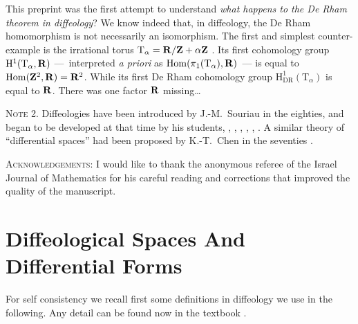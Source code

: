 \documentclass[12pt,reqno]{amsart}
\theoremstyle{article}
\def \D{\mathrm D}
\def \H{\mathrm H}
\def \R{\mathrm R}
\def \T{\mathrm T}
\newcommand{\RR}{{\bf R}}
\newcommand{\ZZ}{{\bf Z}}
\DeclareMathOperator{\Hom}{Hom}
\def \H{\mathrm H}
\begin{document}
  This preprint was the first attempt to understand \emph{what happens to the De Rham theorem in diffeology}?
  We know indeed that,
  in diffeology,
  the De Rham homomorphism is not necessarily an isomorphism.
  The first and simplest counter-example is the irrational torus $\T_\alpha = \RR/ \ZZ + \alpha \ZZ$ \cite{DonIgl83}.
  Its first cohomology group $\H^1(\T_\alpha,\RR)$
  ---~interpreted \emph{a priori} as $\Hom(\pi_1(\T_\alpha),\RR)$~---
  is equal to $\Hom(\ZZ^2,\RR) = \RR^2$.
  While its first De Rham cohomology group $\H^1_{\D\R}(\T_\alpha)$ is equal to $\RR$.
  There was one factor $\RR$ missing\dots
  
  \textsc{Note 2.} Diffeologies have been introduced by J.-M.~Souriau in the eighties,
  and began to be developed at that time by his students,
  \cite{Sou80},
  \cite{DonIgl83},
  \cite{Sou84-a},
  \cite{Sou84-b},
  \cite{Don84},
  \cite{Igl85}.
  A similar theory of ``differential spaces'' had been proposed by K.-T.~Chen in the seventies \cite{Che77}.
  
  \textsc{Acknowledgements:} I would like to thank the anonymous referee of the Israel Journal of Mathematics for his careful reading and corrections that improved the quality of the manuscript.
  
  
  \section{Diffeological Spaces And Differential Forms}
  
  For self consistency we recall first some definitions in diffeology we use in the following.
  Any detail can be found now in the textbook \cite{PIZ13}.
  
\end{document}
